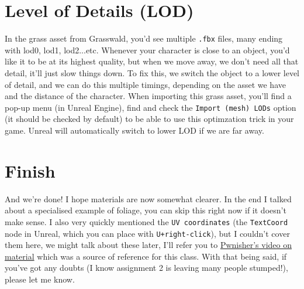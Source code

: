 \documentclass{article}
\begin{document}
\section{Level of Details (LOD)}
In the grass asset from Grasswald, you'd see multiple \verb|.fbx| files, many ending with lod0, lod1, lod2...etc. Whenever your character is close to an object, you'd like it to be at its highest quality, but when we move away, we don't need all that detail, it'll just slow things down. To fix this, we switch the object to a lower level of detail, and we can do this multiple timings, depending on the asset we have and the distance of the character. When importing this grass asset, you'll find a pop-up menu (in Unreal Engine), find and check the \verb|Import (mesh) LODs| option (it should be checked by default) to be able to use this optimzation trick in your game. Unreal will automatically switch to lower LOD if we are far away.

\section{Finish}
And we're done! I hope materials are now somewhat clearer. In the end I talked about a specialised example of foliage, you can skip this right now if it doesn't make sense. I also very quickly mentioned the \verb|UV coordinates| (the \verb|TextCoord| node in Unreal, which you can place with \verb|U+right-click|), but I couldn't cover them here, we might talk about these later, I'll refer you to \href{https://youtu.be/iZgbzwBQTPY?si=RWXS4BLgUupEaC45}{Pwnisher's video on material} which was a source of reference for this class. With that being said, if you've got any doubts (I know assignment 2 is leaving many people stumped!), please let me know.
\end{document}
